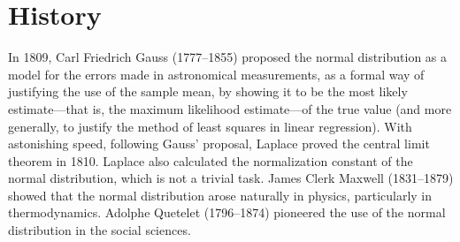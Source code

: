 \documentclass[12pt]{article}
\begin{document}
\section{History}

In 1809, Carl Friedrich Gauss (1777--1855) proposed the normal distribution as a model for the errors made in astronomical measurements, as a formal way of justifying the use of the sample mean, by showing it to be the most likely estimate---that is, the maximum likelihood estimate---of the true value (and more generally, to justify the method of least squares in linear regression). With astonishing speed, following Gauss' proposal, Laplace proved the central limit theorem in 1810.  Laplace also calculated the normalization constant of the normal distribution, which is not a trivial task.  James Clerk Maxwell (1831--1879) showed that the normal distribution arose naturally in physics, particularly in thermodynamics.  Adolphe Quetelet (1796--1874) pioneered the use of the normal distribution in the social sciences.
\end{document}
